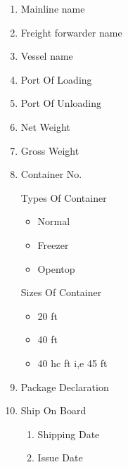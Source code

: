 \documentclass[10pt]{article}
\begin{document}
\begin{enumerate}
\begin{enumerate}
\begin{enumerate}
\end{enumerate}
        \item Mainline name
        \item Freight forwarder name
        \item Vessel name
        \item Port Of Loading
        \item Port Of Unloading
        \item Net Weight
        \item Gross Weight
        \item Container No.
\begin{description}
    \item [Types Of Container]
\end{description}
\begin{itemize}
        \item Normal
        \item Freezer
        \item Opentop
\end{itemize}
\begin{description}
    \item [Sizes Of Container]
\end{description}
\begin{itemize}
        \item 20 ft
        \item 40 ft
        \item 40 hc ft i,e 45 ft 
\end{itemize}
    \item Package Declaration
    \item Ship On Board
\begin{enumerate}
    \item Shipping Date
    \item Issue Date
\end{enumerate}
\end{enumerate}
\end{enumerate}
\end{document}
